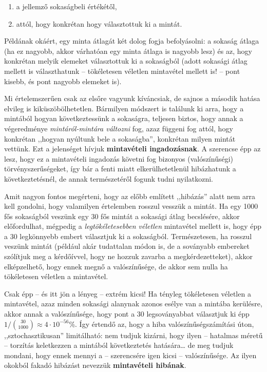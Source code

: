 \documentclass[]{book}
\providecommand{\tightlist}{%
  \setlength{\itemsep}{0pt}\setlength{\parskip}{0pt}}
\begin{document}
\begin{enumerate}
\def\labelenumi{\arabic{enumi}.}
\tightlist
\item
  a jellemző sokaságbeli értékétől,
\item
  attól, hogy konkrétan hogy választottuk ki a mintát.
\end{enumerate}

Példának okáért, egy minta átlagát két dolog fogja befolyásolni: a
sokaság átlaga (ha ez nagyobb, akkor várhatóan egy minta átlaga is
nagyobb lesz) és az, hogy konkrétan melyik elemeket választottuk ki a
sokaságból (adott sokasági átlag mellett is választhatunk -- tökéletesen
véletlen mintavétel mellett is! -- pont kisebb, és pont nagyobb elemeket
is).

Mi értelemszerűen csak az elsőre vagyunk kíváncsiak, de sajnos a második
hatása elvileg is kiküszöbölhetetlen. Bármilyen módszert is találunk ki
arra, hogy a mintából hogyan következtessünk a sokaságra, teljesen
biztos, hogy annak a végeredménye \emph{mintáról-mintára változni} fog,
azaz függeni fog attól, hogy konkrétan ,,hogyan nyúltunk bele a
sokaságba'', konkrétan milyen mintát vettünk. Ezt a jelenséget hívjuk
\textbf{mintavételi ingadozásnak}. A szerencse épp az lesz, hogy ez a
mintavételi ingadozás követni fog bizonyos (valószínűségi)
törvényszerűségeket, így bár a fenti miatt elkerülhetetlenül hibázhatunk
a következtetésnél, de annak természetéről fogunk tudni nyilatkozni.

Amit nagyon fontos megérteni, hogy az előbb említett ,,hibázás'' alatt
nem arra kell gondolni, hogy valamilyen értelemben rosszul vesszük a
mintát. Ha egy 1000 fős sokaságból veszünk egy 30 fős mintát a sokasági
átlag becslésére, akkor előfordulhat, mégpedig a \emph{legtökéletesebben
véletlen} mintavétel mellett is, hogy épp a 30 legkönnyebb embert
választjuk ki a sokaságból. Természetesen, ha rosszul veszünk mintát
(például akár tudattalan módon is, de a soványabb embereket szólítjuk
meg a kérdőívvel, hogy ne hozzuk zavarba a megkérdezetteket), akkor
elképzelhető, hogy ennek megnő a valószínűsége, de akkor sem nulla ha
tökéletesen véletlen a mintavétel.

Csak épp -- és itt jön a lényeg -- extrém kicsi! Ha tényleg tökéletesen
véletlen a mintavétel, azaz minden sokasági alanynak azonos esélye van a
mintába kerülésre, akkor annak a valószínűsége, hogy pont a 30
legsoványabbat választjuk ki épp
\(1/\binom{30}{1000}\approx 4\cdot 10^{-56}\)\%. Így értendő az, hogy a
hiba valószínűségszámítási úton, ,,sztochasztikusan'' limitálható: nem
tudjuk kizárni, hogy ilyen -- hatalmas méretű -- torzítás keletkezzen a
mintából következtetés hatására\dots{} de meg tudjuk mondani, hogy ennek
mennyi a -- szerencsére igen kicsi -- valószínűsége. Az ilyen okokból
fakadó hibázást nevezzük \textbf{mintavételi hibának}.
\end{document}
